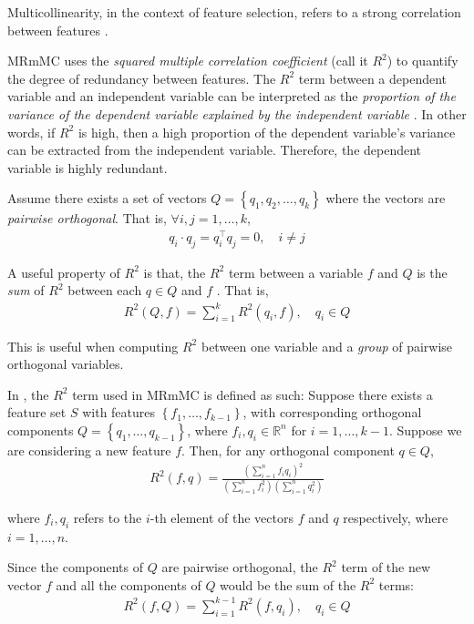 \documentclass[12pt, twoside, a4paper]{report}
\begin{document}
Multicollinearity, in the context of feature selection, refers to a strong correlation between features \cite{RefWorks:234}.

MRmMC uses the \textit{squared multiple correlation coefficient} (call it $R^2$) to quantify the degree of redundancy between features. The $R^2$ term between a dependent variable and an independent variable can be interpreted as the \textit{proportion of the variance of the dependent variable explained by the independent variable} \cite{RefWorks:193}. In other words, if $R^2$ is high, then a high proportion of the dependent variable's variance can be extracted from the independent variable. Therefore, the dependent variable is highly redundant.

Assume there exists a set of vectors $Q=\left\lbrace q_1, q_2, \dots, q_k \right\rbrace$ where the vectors are \textit{pairwise orthogonal}. That is, $\forall i,j = 1, \dots, k$,
\begin{align*}
q_i \cdot q_j = q_i^\top q_j = 0, \quad i \neq j 
\end{align*}

A useful property of $R^2$ is that, the $R^2$ term between a variable $f$ and $Q$ is the \textit{sum} of $R^2$ between each $q \in Q$ and $f$ \cite{RefWorks:193}. That is,
\begin{align*}
R^2(Q, f) = \sum_{i=1}^k R^2(q_i, f), \quad q_i \in Q
\end{align*}

This is useful when computing $R^2$ between one variable and a \textit{group} of pairwise orthogonal variables.

In \cite{RefWorks:187}, the $R^2$ term used in MRmMC is defined as such: Suppose there exists a feature set $S$ with features $\left\lbrace f_1 , \dots , f_{k-1} \right\rbrace$, with corresponding orthogonal components $Q= \left\lbrace q_1, \dots , q_{k-1} \right\rbrace$, where $f_i, q_i \in \mathbb{R}^n$ for $i=1, \dots, k-1$. Suppose we are considering a new feature $f$. Then, for any orthogonal component $q \in Q$,
\begin{align}
R^2(f, q) = \frac{\left( \sum_{i=1}^n f_iq_i \right)^2}{\left(\sum_{i=1}^n f_i^2 \right) \left( \sum_{i=1}^n q_i^2 \right)} \label{mrmmc:r2}
\end{align}

where $f_i,q_i$ refers to the $i$-th element of the vectors $f$ and $q$ respectively, where $i=1, \dots , n$.

Since the components of $Q$ are pairwise orthogonal, the $R^2$ term of the new vector $f$ and all the components of $Q$ would be the sum of the $R^2$ terms:
\begin{align*}
R^2(f, Q) = \sum_{i=1}^{k-1} R^2(f, q_i), \quad q_i \in Q
\end{align*}
\end{document}
